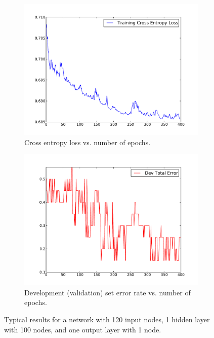 \documentclass[12pt,solutions]{article}
\begin{document}
\begin{figure}
        \centering
        \begin{subfigure}[b]{0.4\textwidth}
                \includegraphics[width=\textwidth]{nn_plots/loss2}
                \caption{Cross entropy loss vs. number of epochs.}
                \label{fig:entropy}
        \end{subfigure}
        \begin{subfigure}[b]{0.4\textwidth}
                \includegraphics[width=\textwidth]{nn_plots/dev2}
                \caption{Development (validation) set error rate vs. number of epochs.}
                \label{fig:dev}
        \end{subfigure}
\caption{Typical results for a network with 120 input nodes, 1 hidden layer with 100 nodes, and one output layer with 1 node.}\label{fig:loss_dev}
\end{figure}
\end{document}
